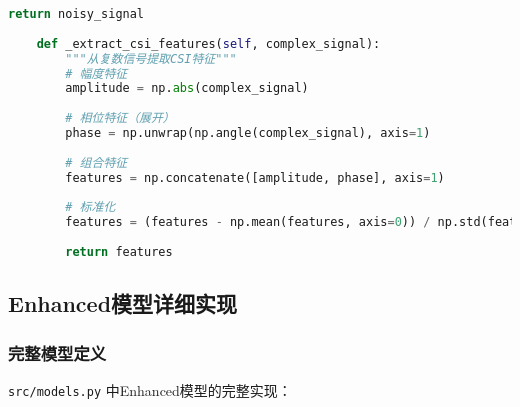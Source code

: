 \begin{lstlisting}[language=Python,caption=合成数据生成器核心实现]
        return noisy_signal
    
    def _extract_csi_features(self, complex_signal):
        """从复数信号提取CSI特征"""
        # 幅度特征
        amplitude = np.abs(complex_signal)
        
        # 相位特征（展开）
        phase = np.unwrap(np.angle(complex_signal), axis=1)
        
        # 组合特征
        features = np.concatenate([amplitude, phase], axis=1)
        
        # 标准化
        features = (features - np.mean(features, axis=0)) / np.std(features, axis=0)
        
        return features
\end{lstlisting}

\subsection{Enhanced模型详细实现}
\label{subsec:enhanced_implementation}

\subsubsection{完整模型定义}
\texttt{src/models.py} 中Enhanced模型的完整实现：

